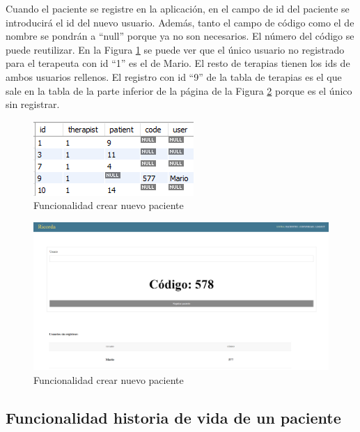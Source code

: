 Cuando el paciente se registre en la aplicación, en el campo de id del paciente se introducirá el id del nuevo usuario. Además, tanto el campo de código como el de nombre se pondrán a ``null'' porque ya no son necesarios. El número del código se puede reutilizar. En la Figura \ref{fig:funcionalidadnuevopacientetablaterapias} se puede ver que el único usuario no registrado para el terapeuta con id ``1'' es el de Mario. El resto de terapias tienen los ids de ambos usuarios rellenos. El registro con id ``9'' de la tabla de terapias es el que sale en la tabla de la parte inferior de la página de la Figura \ref{fig:funcionalidadnuevopaciente} porque es el único sin registrar.  
 
 \begin{figure}[h]
 	\centering
 	\includegraphics[scale=1.6]{Imagenes/Vectorial/funcionalidad_nuevo_paciente_tabla_terapias}
 	\caption{Funcionalidad crear nuevo paciente}
 	\label{fig:funcionalidadnuevopacientetablaterapias}
 \end{figure}

\begin{figure}[h]
	\centering
	\includegraphics[scale=0.3]{Imagenes/Vectorial/funcionalidad_nuevo_paciente}
	\caption{Funcionalidad crear nuevo paciente}
	\label{fig:funcionalidadnuevopaciente}
\end{figure}



\subsection{Funcionalidad historia de vida de un paciente}

